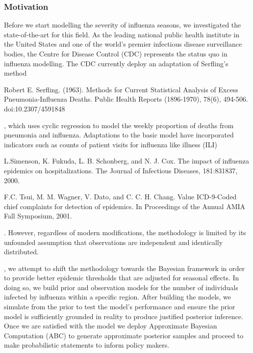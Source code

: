 \documentclass[letterpaper,10pt,english]{sphinxmanual}
\begin{document}
\subsubsection{Motivation}
\label{\detokenize{models/how_big:motivation}}
Before we start modelling the severity of influenza seasons, we investigated the state-of-the-art for this field. As the leading national public health institute in the United States and one of the world’s premier infectious disease surveillance bodies, the Centre for Disease Control (CDC) represents the status quo in influenza modelling. The CDC currently deploy an adaptation of Serfling’s method %
\begin{footnote}[1]\sphinxAtStartFootnote
Robert E. Serfling. (1963). Methods for Current Statistical Analysis of Excess Pneumonia-Influenza Deaths. Public Health Reports (1896-1970), 78(6), 494-506. doi:10.2307/4591848
%
\end{footnote}, which uses cyclic regression to model the weekly proportion of deaths from pneumonia and influenza. Adaptations to the basic model have incorporated indicators such as counts of patient visits for influenza like illness (ILI) %
\begin{footnote}[2]\sphinxAtStartFootnote
L.Simenson, K. Fukuda, L. B. Schonberg, and N. J. Cox. The impact of influenza epidemics on hospitalizations. The Journal of Infectious Diseases, 181:831\textendash{}837, 2000.
%
\end{footnote} %
\begin{footnote}[3]\sphinxAtStartFootnote
F.C. Tsui, M. M. Wagner, V. Dato, and C. C. H. Chang. Value ICD-9-Coded chief complaints for detection of epidemics. In Proceedings of the Annual AMIA Fall Symposium, 2001.
%
\end{footnote}. However, regardless of modern modifications, the methodology is limited by its unfounded assumption that observations are independent and identically distributed.

, we attempt to shift the methodology towards the Bayesian
framework in order to provide better epidemic thresholds that are
adjusted for seasonal effects. In doing so, we build prior and
observation models for the number of individuals infected by influenza
within a specific region. After building the models, we simulate from the
prior to test the model’s performance and ensure the prior model is
sufficiently grounded in reality to produce justified posterior
inference. Once we are satisfied with the model we deploy Approximate
Bayesian Computation (ABC) to generate approximate posterior samples and
proceed to make probabilistic statements to inform policy makers.
\end{document}
